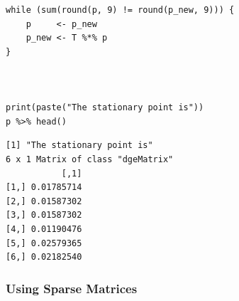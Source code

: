 \documentclass[11pt]{article}
\begin{document}
\begin{enumerate}
\begin{lstlisting}
while (sum(round(p, 9) != round(p_new, 9))) {
    p     <- p_new
    p_new <- T %*% p
}



print(paste("The stationary point is"))
p %>% head()
\end{lstlisting}

\begin{verbatim}
[1] "The stationary point is"
6 x 1 Matrix of class "dgeMatrix"
           [,1]
[1,] 0.01785714
[2,] 0.01587302
[3,] 0.01587302
[4,] 0.01190476
[5,] 0.02579365
[6,] 0.02182540
\end{verbatim}
\end{enumerate}
\subsubsection{Using Sparse Matrices}
\label{sec:org6ff38c6}
\end{document}
